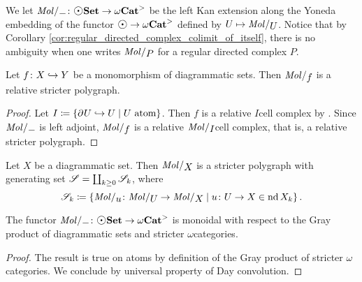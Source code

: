 We let \( \molecin{-} \colon \dgmSet \to \somegaCat \) be the left Kan extension along the Yoneda embedding of the functor \( \atom \to \somegaCat \) defined by \( U \mapsto \molecin{U} \).
Notice that by Corollary \ref{cor:regular_directed_complex_colimit_of_itself}, there is no ambiguity when one writes \( \molecin{P} \) for a regular directed complex \( P \).

\begin{lem} \label{lem:molecin_preserves_cofibration}
    Let \( f \colon X \hookrightarrow Y \) be a monomorphism of diagrammatic sets.
    Then \( \molecin{f} \) is a relative stricter polygraph.
\end{lem}
\begin{proof}
    Let \( I \coloneqq \left\{ {\partial_{}^{} U \hookrightarrow U \mid U \text{ atom}} \right\} \).
    Then \( f \) is a relative \( I \)\nbd cell complex by \cite[Remark 2.9]{chanavat2024htpy}.
    Since \( \molecin{-} \) is left adjoint, \( \molecin{f} \) is a relative \( \molecin{I} \)\nbd cell complex, that is, a relative stricter polygraph.
\end{proof}

\begin{cor} \label{cor:molecin_polygraph_with_basis}
    Let \( X \) be a diagrammatic set. 
    Then \( \molecin{X} \) is a stricter polygraph with generating set \( \mathscr{S} = \coprod_{k \geq 0} \mathscr{S}_k \), where
    \begin{equation*}
        \cls{S}_k \eqdef \set{\molecin{u} \colon \molecin{U} \to \molecin{X} \mid u \colon U \to X \in \gr{k}{\nd X}}.
    \end{equation*}
\end{cor}

\begin{lem} \label{lem:molecin_monoidal}
    The functor \( \molecin{-} \colon \dgmSet \to \somegaCat \) is monoidal with respect to the Gray product of diagrammatic sets and stricter \( \omega \)\nbd categories.
\end{lem}
\begin{proof}
    The result is true on atoms by definition of the Gray product of stricter \( \omega \)\nbd categories.
    We conclude by universal property of Day convolution.
\end{proof}

